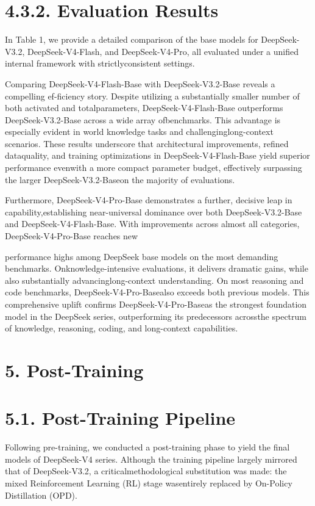 \documentclass[
  10
]{article}
\begin{document}
\section{4.3.2. Evaluation Results}\label{evaluation-results}

In Table 1, we provide a detailed comparison of the base models for
DeepSeek-V3.2, DeepSeek-V4-Flash, and DeepSeek-V4-Pro, all evaluated
under a unified internal framework with strictlyconsistent settings.

Comparing DeepSeek-V4-Flash-Base with DeepSeek-V3.2-Base reveals a
compelling ef-ficiency story. Despite utilizing a substantially smaller
number of both activated and totalparameters, DeepSeek-V4-Flash-Base
outperforms DeepSeek-V3.2-Base across a wide array ofbenchmarks. This
advantage is especially evident in world knowledge tasks and
challenginglong-context scenarios. These results underscore that
architectural improvements, refined dataquality, and training
optimizations in DeepSeek-V4-Flash-Base yield superior performance
evenwith a more compact parameter budget, effectively surpassing the
larger DeepSeek-V3.2-Baseon the majority of evaluations.

Furthermore, DeepSeek-V4-Pro-Base demonstrates a further, decisive leap
in capability,establishing near-universal dominance over both
DeepSeek-V3.2-Base and DeepSeek-V4-Flash-Base. With improvements across
almost all categories, DeepSeek-V4-Pro-Base reaches new

performance highs among DeepSeek base models on the most demanding
benchmarks. Onknowledge-intensive evaluations, it delivers dramatic
gains, while also substantially advancinglong-context understanding. On
most reasoning and code benchmarks, DeepSeek-V4-Pro-Basealso exceeds
both previous models. This comprehensive uplift confirms
DeepSeek-V4-Pro-Baseas the strongest foundation model in the DeepSeek
series, outperforming its predecessors acrossthe spectrum of knowledge,
reasoning, coding, and long-context capabilities.

\section{5. Post-Training}\label{post-training}

\section{5.1. Post-Training Pipeline}\label{post-training-pipeline}

Following pre-training, we conducted a post-training phase to yield the
final models of DeepSeek-V4 series. Although the training pipeline
largely mirrored that of DeepSeek-V3.2, a criticalmethodological
substitution was made: the mixed Reinforcement Learning (RL) stage
wasentirely replaced by On-Policy Distillation (OPD).
\end{document}

